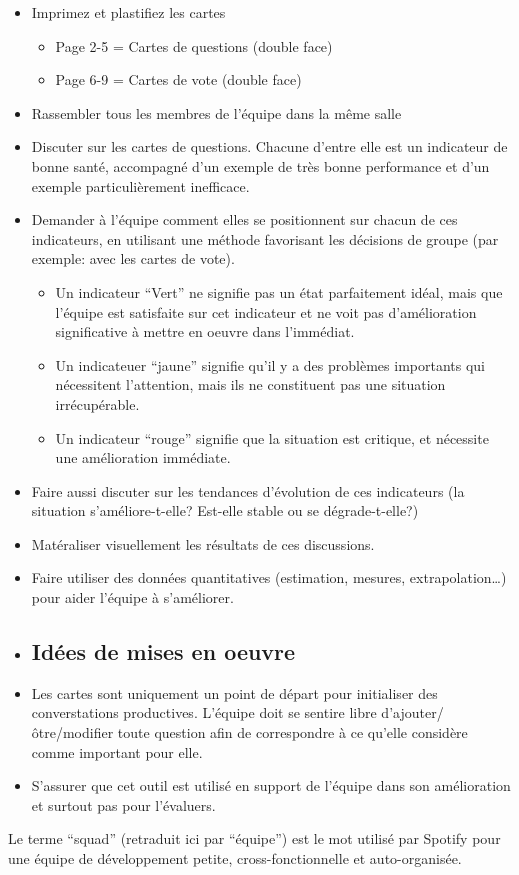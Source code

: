 \begin{itemize}
\item Imprimez et plastifiez les cartes


\begin{itemize}
\item Page 2-5 = Cartes de questions (double face)
\item Page 6-9 = Cartes de vote (double face)
\end{itemize}
\item Rassembler tous les membres de l'équipe dans la même salle
\item Discuter sur les cartes de questions. Chacune d'entre elle est un indicateur de bonne santé, accompagné d'un exemple de très bonne performance et d'un exemple particulièrement inefficace.
\item Demander à l'équipe comment elles se positionnent sur chacun de ces indicateurs, en utilisant une méthode favorisant les décisions de groupe (par exemple: avec les cartes de vote).


\begin{itemize}
\item Un indicateur ``Vert'' ne signifie pas un état parfaitement idéal, mais que l'équipe est satisfaite sur cet indicateur et ne voit pas d'amélioration significative à mettre en oeuvre dans l'immédiat.
\item Un indicateuer ``jaune'' signifie qu'il y a des problèmes importants qui nécessitent l'attention, mais ils ne constituent pas une situation irrécupérable.
\item Un indicateur ``rouge'' signifie que la situation est critique, et nécessite une amélioration immédiate.
\end{itemize}
\item Faire aussi discuter sur les tendances d'évolution de ces indicateurs (la situation s'améliore-t-elle? Est-elle stable ou se dégrade-t-elle?)
\item Matéraliser visuellement les résultats de ces discussions.
\item Faire utiliser des données quantitatives (estimation, mesures, extrapolation\ldots{}) pour aider l'équipe à s'améliorer.
\item \subsection{Idées de mises en oeuvre}
\item Les cartes sont uniquement un point de départ pour initialiser des converstations productives. L'équipe doit se sentire libre d'ajouter/ôtre/modifier toute question afin de correspondre à ce qu'elle considère comme important pour elle.
\item S'assurer que cet outil est utilisé en support de l'équipe dans son amélioration et surtout pas pour l'évaluers.
\end{itemize}

Le terme ``squad''  (retraduit ici par ``équipe'') est le mot utilisé par Spotify pour une équipe de développement petite, cross-fonctionnelle et auto-organisée.

